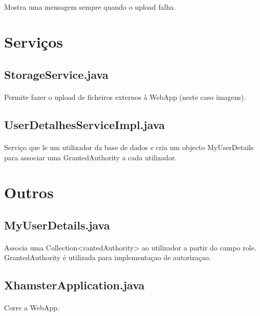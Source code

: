 \documentclass[11pt]{article}
\begin{document}
	\paragraph{}
	Mostra uma mensagem sempre quando o upload falha.

\section{Serviços}
	\subsection{StorageService.java}
	\paragraph{}
	Permite fazer o upload de ficheiros externos à WebApp (neste caso imagens).

 	\subsection{UserDetalhesServiceImpl.java}
	\paragraph{}
	Serviço que le um utilizador da base de dados e cria um objecto MyUserDetails para associar uma GrantedAuthority a cada utilizador.

\section{Outros}
	\subsection{MyUserDetails.java}
	\paragraph{}
	Associa uma Collection<rantedAuthority> ao utilizador a partir do campo role. GrantedAuthority é utilizada para implementaçao de autorizaçao.

	\subsection{XhamsterApplication.java}
	\paragraph{}
	Corre a WebApp.


	
\end{document}
